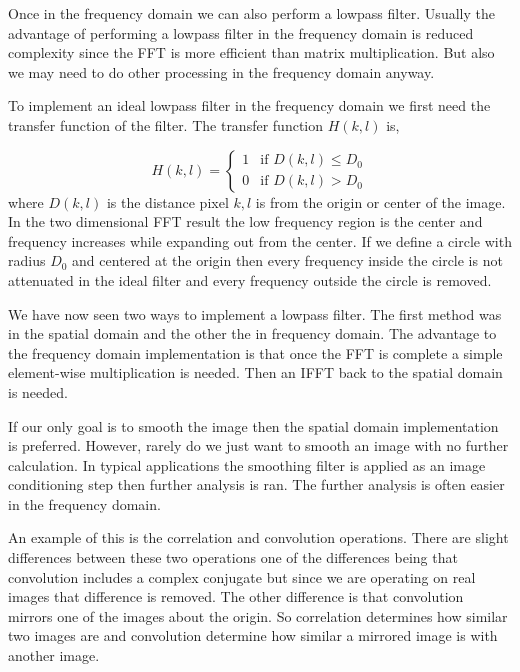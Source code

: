 Once in the frequency domain we can also perform a lowpass filter. Usually the advantage of performing a lowpass filter in the frequency domain is reduced complexity since the \ac{FFT} is more efficient than matrix multiplication. But also we may need to do other processing in the frequency domain anyway. 

To implement an ideal lowpass filter in the frequency domain we first need the transfer function of the filter. The transfer function $H(k,l)$ is,

\begin{equation}
H(k,l) = 
\begin{cases}
1 & \text{if $D(k,l) \leq D_0$}\\
0 & \text{if $D(k,l) > D_0$}
\end{cases}
\end{equation}
\noindent
where $D(k,l)$ is the distance pixel $k,l$ is from the origin or center of the image. In the two dimensional \ac{FFT} result the low frequency region is the center and frequency increases while expanding out from the center. If we define a circle with radius $D_0$ and centered at the origin then every frequency inside the circle is not attenuated in the ideal filter and every frequency outside the circle is removed. 

We have now seen two ways to implement a lowpass filter. The first method was in the spatial domain and the other the in frequency domain. The advantage to the frequency domain implementation is that once the \ac{FFT} is complete a simple element-wise multiplication is needed. Then an \ac{IFFT} back to the spatial domain is needed. 

If our only goal is to smooth the image then the spatial domain implementation is preferred. However, rarely do we just want to smooth an image with no further calculation. In typical applications the smoothing filter is applied as an image conditioning step then further analysis is ran. The further analysis is often easier in the frequency domain.

An example of this is the correlation and convolution operations. There are slight differences between these two operations one of the differences being that convolution includes a complex conjugate but since we are operating on real images that difference is removed. The other difference is that convolution mirrors one of the images about the origin. So correlation determines how similar two images are and convolution determine how similar a mirrored image is with another image. 

